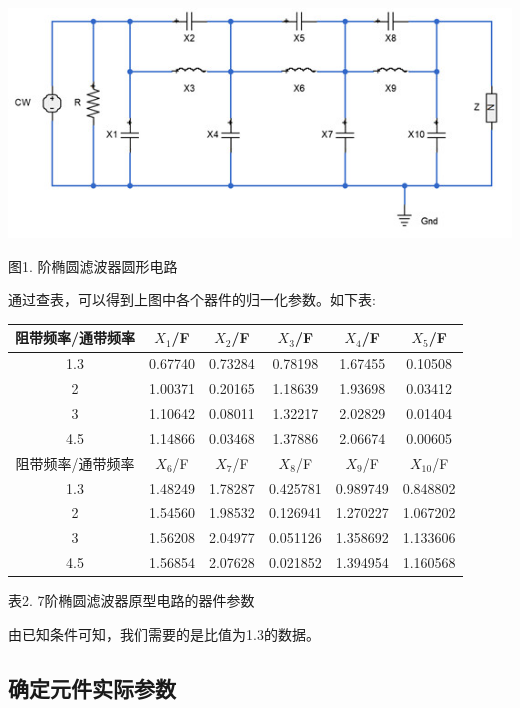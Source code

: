 \documentclass{article}
\begin{document}
\begin{CJK}{UTF8}{gbsn}
\begin{center}
\includegraphics[scale=0.6]{original_circuits}

图1. 阶椭圆滤波器圆形电路
\end{center}

通过查表，可以得到上图中各个器件的归一化参数。如下表:

\begin{center}
\begin{tabular}{c | c | c | c | c | c }

阻带频率/通带频率 & \(X_1\)/F & \(X_2\)/F & \(X_3\)/F & \(X_4\)/F & \(X_5\)/F \\
\hline
1.3 & 0.67740 & 0.73284 & 0.78198 & 1.67455 & 0.10508 \\
2  & 1.00371 & 0.20165  & 1.18639 & 1.93698 & 0.03412 \\
3   & 1.10642 & 0.08011 & 1.32217 & 2.02829 & 0.01404 \\
4.5 & 1.14866 & 0.03468 & 1.37886 & 2.06674 & 0.00605 \\
\hline
阻带频率/通带频率 & \(X_6\)/F & \(X_7\)/F & \(X_8\)/F & \(X_9\)/F & \(X_{10}\)/F \\
\hline
1.3 & 1.48249 & 1.78287 & 0.425781 & 0.989749 & 0.848802 \\
2   & 1.54560 & 1.98532 & 0.126941 & 1.270227 & 1.067202 \\
3   & 1.56208 & 2.04977 & 0.051126 & 1.358692 & 1.133606 \\
4.5 & 1.56854 & 2.07628 & 0.021852 & 1.394954 & 1.160568 

\end{tabular}

表2. 7阶椭圆滤波器原型电路的器件参数
\end{center}


由已知条件可知，我们需要的是比值为1.3的数据。

\subsection{确定元件实际参数}


\end{CJK}
\end{document}
